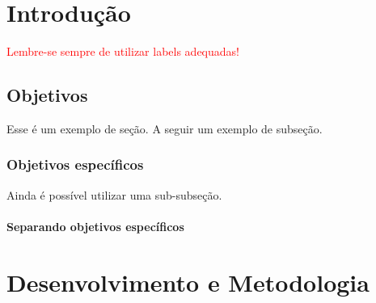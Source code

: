 \documentclass[
	12pt,				%
	openany,
    oneside,			%
	a4paper,			%
	chapter=TITLE,		%
	french,				%
	spanish,			%
	english				%
	]{ifce-relatorio-abntex2}
\begin{document}

\frenchspacing 


\imprimircapa

\tableofcontents*
\cleardoublepage

\textual

\chapter{Introdução} \label{ch:intro}
\textcolor{red}{Lembre-se sempre de utilizar labels adequadas!}

\lipsum[2-2]

\section{Objetivos} \label{sec:obj}
Esse é um exemplo de seção. A seguir um exemplo de subseção.

\subsection{Objetivos específicos} \label{subsec:objEspec}
Ainda é possível utilizar uma sub-subseção. 

\subsubsection{Separando objetivos específicos} \label{subsubsec:sep_objEspec}

\chapter{Desenvolvimento e Metodologia} \label{ch:metodos}
\lipsum[2-3]
\end{document}
